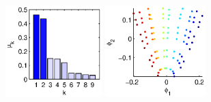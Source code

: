 \documentclass[preprint]{elsarticle}
\begin{document}
\begin{figure}
%
\def\figheight{1.4in}
%
\begin{subfigure}[t]{0.31\textwidth}
\centering
\includegraphics[height=\figheight]{chemotaxis1_evals}
\includegraphics[height=\figheight]{chemotaxis1_embed_good}
\vspace{1.2in}
\caption{}
\end{subfigure}
%
\begin{subfigure}[t]{0.31\textwidth}
\centering

\end{subfigure}
\end{figure}
\end{document}
